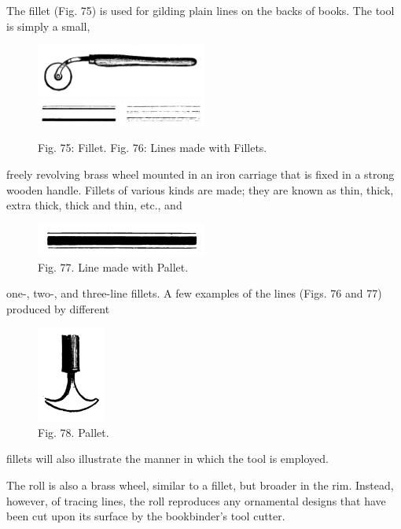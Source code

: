 \documentclass[twoside]{book}
\begin{document}
The fillet (Fig. 75) is used for gilding plain lines
on the backs of books. The tool is simply a small,
\begin{figure}[h]
	\centering
	\includegraphics[width=0.5\textwidth]{Figures/_075.png}
	\includegraphics[width=0.5\textwidth]{Figures/_076.png}
	\caption*{
		Fig. 75: Fillet.
		Fig. 76: Lines made with Fillets.
	}
\end{figure}
freely revolving brass wheel mounted in an iron
carriage that is fixed in a strong wooden handle.
Fillets of various kinds are made; they are known
as thin, thick, extra thick, thick and thin, etc., and
\begin{figure}[h]
	\centering
	\includegraphics[width=0.5\textwidth]{Figures/_077.png}
	\caption*{
		Fig. 77. Line made with Pallet.
	}
\end{figure}
one-, two-, and three-line fillets. A few examples
of the lines (Figs. 76 and 77) produced by different
\begin{figure}[h]
	\centering
	\includegraphics[width=0.2\textwidth]{Figures/_078.png}
	\caption*{
		Fig. 78. Pallet.
	}
\end{figure}
fillets will also illustrate the manner in which the
tool is employed.

The roll is also a brass wheel, similar to a fillet,
but broader in the rim. Instead, however, of tracing
\pagebreak
lines, the roll reproduces any ornamental designs
that have been cut upon its surface by the bookbinder's
tool cutter.
\end{document}
